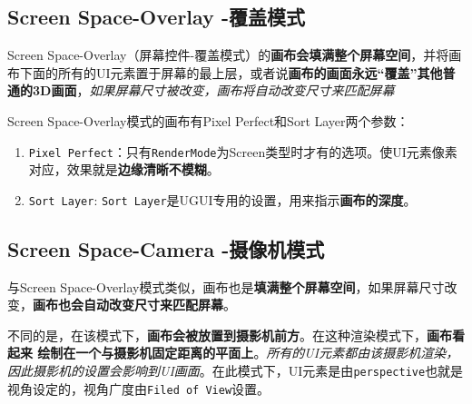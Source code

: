 \documentclass[UTF8,a4paper,12pt]{ctexbook}
\begin{document}
		\subsection{Screen Space-Overlay -覆盖模式}
			Screen Space-Overlay（屏幕控件-覆盖模式）的\textbf{画布会填满整个屏幕空间}，并将画布下面的所有的UI元素置于屏幕的最上层，或者说\textbf{画布的画面永远“覆盖”其他普通的3D画面}，\textit{如果屏幕尺寸被改变，画布将自动改变尺寸来匹配屏幕}
			
			Screen Space-Overlay模式的画布有Pixel Perfect和Sort Layer两个参数：
			\begin{enumerate}[itemindent = 1em]
				\item \verb|Pixel Perfect|：只有\verb|RenderMode|为Screen类型时才有的选项。使UI元素像素对应，效果就是\textbf{边缘清晰不模糊}。
				\item \verb|Sort Layer|: \verb|Sort Layer|是UGUI专用的设置，用来指示\textbf{画布的深度}。
			\end{enumerate}
		
		\subsection{Screen Space-Camera -摄像机模式}
			与Screen Space-Overlay模式类似，画布也是\textbf{填满整个屏幕空间}，如果屏幕尺寸改变，\textbf{画布也会自动改变尺寸来匹配屏幕}。
			
			不同的是，在该模式下，\textbf{画布会被放置到摄影机前方}。在这种渲染模式下，\textbf{画布看起来 绘制在一个与摄影机固定距离的平面上}。\textit{所有的UI元素都由该摄影机渲染，因此摄影机的设置会影响到UI画面}。在此模式下，UI元素是由\verb|perspective|也就是视角设定的，视角广度由\verb|Filed of View|设置。
			
\end{document}
